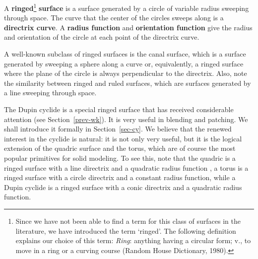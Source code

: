 \begin{defn2}
\label{ringed}
A {\bf ringed}\footnote{
	Since we have not been able to find a term for this class of surfaces
	in the literature, we have introduced the term `ringed'.
	The following definition explains our choice of this term:
	{\em Ring}: anything having a circular form; v.,
	to move in a ring or a curving course (Random House Dictionary, 1980).}
{\bf surface} %
is a surface generated by a circle of variable radius sweeping through space.
The curve that the center of the circles sweeps along is 
a {\bf directrix curve}.
A {\bf radius function} and {\bf orientation function} 
give the radius and orientation of the circle at each point of the
directrix curve.
\end{defn2}

\begin{rmk}
A well-known subclass of ringed surfaces is the canal surface, 
which is a surface generated by sweeping a sphere along a curve
or, equivalently, a ringed surface where the 
plane of the circle is always perpendicular to the directrix.
Also, note the similarity between ringed and ruled surfaces, 
which are surfaces generated by a line sweeping through space.
\end{rmk}

The Dupin cyclide is a special ringed surface that has received
considerable attention (see Section~\ref{prev-wk}).
It is very useful in blending and patching.
We shall introduce it formally in Section~\ref{sec-cy}.
We believe that the renewed interest in the cyclide is natural:
it is not only very useful, but it is the logical extension
of the quadric surface and the torus, which are of course the most
popular primitives for solid modeling.
To see this, note that the quadric is a ringed surface with
a line directrix and a quadratic radius function \cite{JS90u,SS14}, 
a torus is a ringed surface with a circle directrix and a constant
radius function, 
while a Dupin cyclide is a ringed surface with a conic directrix 
and a quadratic radius function.


